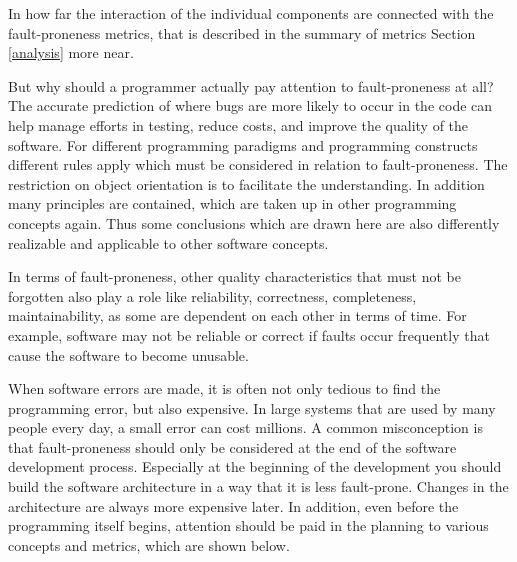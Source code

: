 In how far the interaction of the individual components are connected with the fault-proneness metrics, that is described in the summary of metrics Section \ref{analysis} more near.

But why should a programmer actually pay attention to fault-proneness at all? The accurate prediction of where bugs are more likely to occur in the code can help manage efforts in testing, reduce costs, and improve the quality of the software. For different programming paradigms and programming constructs different rules apply which must be considered in relation to fault-proneness.  The restriction on object orientation is to facilitate the understanding. In addition many principles are contained, which are taken up in other programming concepts again. Thus some conclusions which are drawn here are also differently realizable and applicable to other software concepts.

In terms of fault-proneness, other quality characteristics that must not be forgotten also play a role like reliability, correctness, completeness, maintainability, as some are dependent on each other in terms of time. For example, software may not be reliable or correct if faults occur frequently that cause the software to become unusable.

When software errors are made, it is often not only tedious to find the programming error, but also expensive. In large systems that are used by many people every day, a small error can cost millions. A common misconception is that fault-proneness should only be considered at the end of the software development process. Especially at the beginning of the development you should build the software architecture in a way that it is less fault-prone. Changes in the architecture are always more expensive later. In addition, even before the programming itself begins, attention should be paid in the planning to various concepts and metrics, which are shown below.